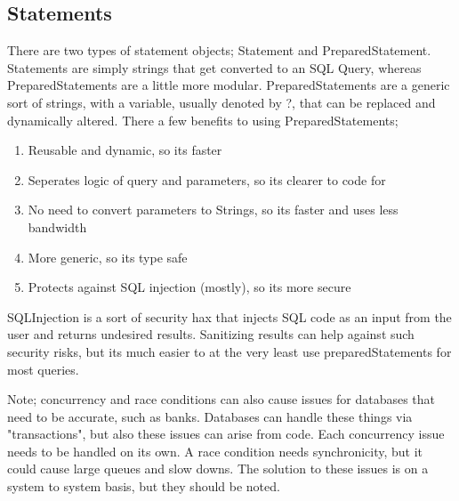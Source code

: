 \subsection{Statements}
There are two types of statement objects; Statement and PreparedStatement. Statements are simply strings that get converted to an SQL Query, whereas PreparedStatements are a little more modular. PreparedStatements are a generic sort of strings, with a variable, usually denoted by ?, that can be replaced and dynamically altered. There a few benefits to using PreparedStatements;
\begin{enumerate}
	\item Reusable and dynamic, so its faster
	\item Seperates logic of query and parameters, so its clearer to code for
	\item No need to convert parameters to Strings, so its faster and uses less bandwidth
	\item More generic, so its type safe
	\item Protects against SQL injection (mostly), so its more secure
\end{enumerate}
SQLInjection is a sort of security hax that injects SQL code as an input from the user and returns undesired results. Sanitizing results can help against such security risks, but its much easier to at the very least use preparedStatements for most queries.

Note; concurrency and race conditions can also cause issues for databases that need to be accurate, such as banks. Databases can handle these things via "transactions", but also these issues can arise from code. Each concurrency issue needs to be handled on its own. A race condition needs synchronicity, but it could cause large queues and slow downs. The solution to these issues is on a system to system basis, but they should be noted.
